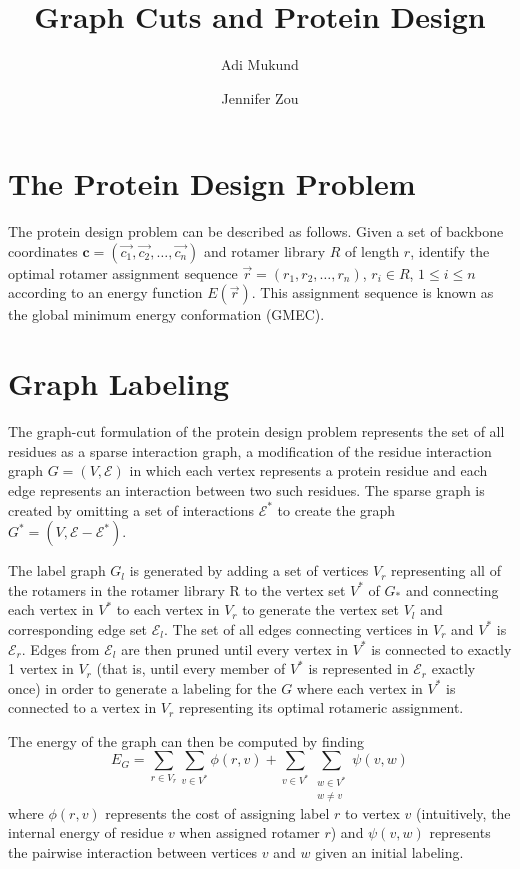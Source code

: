 \documentclass[11pt]{article}
\title{\textbf{Graph Cuts and Protein Design}}
\author{Adi Mukund \and Jennifer Zou}
\date{}
\begin{document}
	\maketitle
	
	\section{The Protein Design Problem}
	
	The protein design problem can be described as follows. Given a set of 
	backbone coordinates $\mathbf{c} = (\vec{c_1}, \vec{c_2 }, \dots, \vec{c_n})$
	and rotamer library $R$ of length $r$, identify the optimal rotamer
	assignment sequence $\vec{r} = (r_1, r_2,\dots, r_n)$, $r_i \in R$, 
	$1 \leq i \leq n$ according to an energy function $E(\vec{r})$. This assignment
	sequence is known as the global minimum energy conformation (GMEC). 
	
	\section{Graph Labeling}
	
	The graph-cut formulation of the protein design problem represents the set
	of all residues as a sparse interaction graph, a modification of the residue
	interaction graph $G = (V, \mathcal{E})$ in which each vertex represents a
	protein residue and each edge represents an interaction between two such
	residues. The sparse graph is created by omitting a set of interactions
	$\mathcal{E}^*$ to create the graph $G^* = (V, \mathcal{E}-\mathcal{E}^*)$.
	
	The label graph $G_l$ is generated by adding a set of vertices $V_r$ 
	representing all of the rotamers in the rotamer library R to the vertex
	set $V^*$ of $G_*$ and connecting each vertex in $V^*$ to each vertex in
	$V_r$ to generate the vertex set $V_l$ and corresponding edge set
	$\mathcal{E}_l$. The set of all edges connecting vertices in $V_r$ and $V^*$
	is $\mathcal{E}_r$. Edges from $\mathcal{E}_l$ are then pruned until every 
	vertex in $V^*$ is connected to exactly 1 vertex in $V_r$ (that is, until 
	every member of $V^*$ is represented in $\mathcal{E}_r$ exactly once) in
	order to generate a labeling for the $G$ where each vertex in $V^*$ is 
	connected to a vertex in $V_r$ representing its optimal rotameric assignment. 
	
	The energy of the graph can then be computed by finding
	\begin{equation} \label{e_g}
	    E_G = 
	    \sum\limits_{r \in V_r} \sum\limits_{v \in V^*} \phi(r,v) +
	    \sum\limits_{v \in V^*} \sum\limits_{\substack{w \in V^* \\ w \neq v}} \psi(v,w)
	\end{equation}
	where $\phi(r,v)$ represents the cost of assigning label $r$ to vertex $v$
	(intuitively, the internal energy of residue $v$ when assigned rotamer $r$)
	and $\psi(v,w)$ represents the pairwise interaction between vertices $v$ and
	$w$ given an initial labeling.	
	
\end{document}
